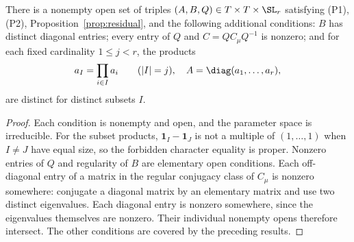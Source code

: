 \begin{lemma}\label{lem:all-open}
There is a nonempty open set of triples $(A,B,Q)\in T\times T\times\SL_r$
satisfying (P1), (P2), Proposition~\ref{prop:residual}, and the following
additional conditions: $B$ has distinct diagonal entries; every entry of
$Q$ and $C=QC_\mu Q^{-1}$ is nonzero; and for each fixed cardinality
$1\leq j<r$, the products
\[
 a_I=\prod_{i\in I}a_i\qquad(|I|=j),\quad A=\diag(a_1,\ldots,a_r),
\]
are distinct for distinct subsets $I$.
\end{lemma}
\begin{proof}
Each condition is nonempty and open, and the parameter space is
irreducible. For the subset products, $\mathbf1_I-\mathbf1_J$ is not a
multiple of $(1,\ldots,1)$ when $I\ne J$ have equal size, so the forbidden
character equality is proper. Nonzero entries of $Q$ and regularity of
$B$ are elementary open conditions. Each off-diagonal entry of a matrix
in the regular conjugacy class of $C_\mu$ is nonzero somewhere: conjugate
a diagonal matrix by an elementary matrix and use two distinct eigenvalues.
Each diagonal entry is nonzero somewhere, since the eigenvalues themselves
are nonzero. Their individual nonempty opens therefore intersect.
The other conditions are covered by the preceding results.
\end{proof}
